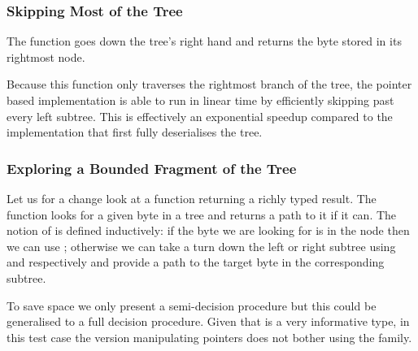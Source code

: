 \subsubsection{Skipping Most of the Tree}

The  function goes down the tree's right hand
and returns the byte stored in its rightmost node.

\smallskip\noindent
\begin{minipage}{.5\textwidth}
\end{minipage}\hfill
\begin{minipage}{.45\textwidth}
\end{minipage}\smallskip

Because this function only traverses the rightmost branch of the tree,
the pointer based implementation is able to run in linear time by
efficiently skipping past every left subtree.
%
This is effectively an exponential speedup compared to the implementation
that first fully deserialises the tree.

\subsubsection{Exploring a Bounded Fragment of the Tree}


Let us for a change look at a function returning a richly typed result.
%
The  function looks for a given byte in a tree
and returns a path to it if it can.
%
The notion of  is defined inductively: if the
 byte we are looking for is in the node then
we can use ; otherwise we can take a turn down
the left or right subtree using  and 
respectively and provide a path to the target byte in the corresponding
subtree.


To save space we only present a semi-decision procedure but this could
be generalised to a full decision procedure.
%
Given that  is a very informative type, in this test
case the version manipulating pointers does not bother using the
 family.

